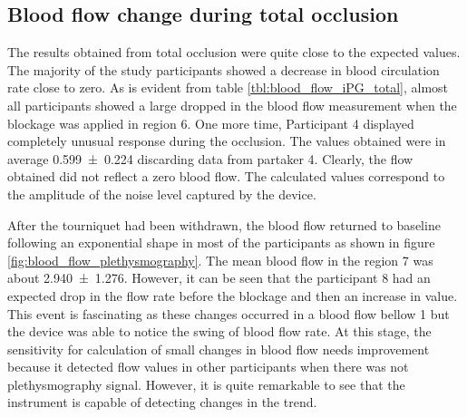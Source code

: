 \subsection{Blood flow change during total occlusion}
\label{section5.5.3}
The results obtained from total occlusion were quite close to the expected values.  The majority of the study participants showed a decrease in blood circulation rate close to zero.  As is evident from table \ref{tbl:blood_flow_iPG_total}, almost all participants showed a large dropped in the blood flow measurement when the blockage was applied in region 6. One more time, Participant 4 displayed completely unusual response during the occlusion. The values obtained were in average \SI{0.599(0224)}{\bfv} discarding data from partaker 4. Clearly, the flow obtained did not reflect a zero blood flow. The calculated values correspond to the amplitude of the noise level captured by the device. 

After the tourniquet had been withdrawn, the blood flow returned to baseline following an exponential shape in most of the participants as shown in figure \ref{fig:blood_flow_plethysmography}. The mean blood flow in the region 7 was about \SI{2.940(1276)}{\bfv}. However, it can be seen that the participant 8 had an expected drop in the flow rate before the blockage and then an increase in value. This event is fascinating as these changes occurred in a blood flow bellow \SI{1}{\bfv} but the device was able to notice the swing of blood flow rate. At this stage, the sensitivity for calculation of small changes in blood flow needs improvement because it detected flow values in other participants when there was not plethysmography signal. However, it is quite remarkable to see that the instrument is capable of detecting changes in the trend.

